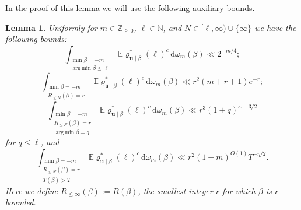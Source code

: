 \documentclass[11pt,reqno]{amsart}
\DeclareMathOperator*{\argmin}{arg\,min}
\numberwithin{equation}{section}
\newtheorem{lemma}[theorem]{Lemma}
\theoremstyle{definition}
\theoremstyle{remark}
\newcommand{\mb}{\mathbb}
\newcommand{\mbf}{\mathbf}
\renewcommand{\le}{\leqslant}
\renewcommand{\ge}{\geqslant}
\newcommand\Z{\mathbb{Z}}
\newcommand\N{\mathbb{N}}
\begin{document}
In the proof of this lemma we will use the following auxiliary bounds.
\begin{lemma}\label{x-ell-bounds} 
Uniformly for $m \in \Z_{\ge 0}$, $\ell \in \N$, and $N \in [\ell, \infty) \cup \{\infty\}$ we have the following bounds:
\begin{equation}\label{exc-bd} \int_{\substack{\min \beta = -m \\ \argmin \beta \le \ell}} \mb{E} \varrho^*_{\mbf{u} \mid \beta}(\ell)^c\, \mathrm{d}\omega_m(\beta) \ll 2^{-m/4};\end{equation}
\begin{equation}\label{exc-rm-bd} \int_{\substack{\min \beta = -m \\ R_{\le N}(\beta) = r }} \mb{E} \varrho^*_{\mbf{u} \mid \beta}(\ell)^c\, \mathrm{d}\omega_m(\beta) \ll r^2(m + r + 1) e^{-r};\end{equation}
\begin{equation}\label{exc-qrm-bd} \int_{\substack{ \min \beta = -m \\ R_{\le N}(\beta) = r \\ \argmin \beta = q}} \mb{E} \varrho^*_{\mbf{u} \mid \beta}(\ell)^c\, \mathrm{d}\omega_m(\beta) \ll r^3 (1 + q)^{\kappa - 3/2} \end{equation} for $q \le \ell$, and
\begin{equation}\label{exc-mt-bd} \int_{\substack{\min \beta = -m \\ R_{\le N}(\beta) = r \\ T(\beta) > T}} \mb{E} \varrho^*_{\mbf{u} \mid \beta}(\ell)^c\, \mathrm{d}\omega_m(\beta) \ll r^{2}(1 + m)^{O(1)} T^{-\eta/2}.\end{equation}
Here we define $R_{\le \infty}(\beta)  := R(\beta)$, the smallest integer $r$ for which $\beta$ is $r$-bounded.\end{lemma}
\end{document}
